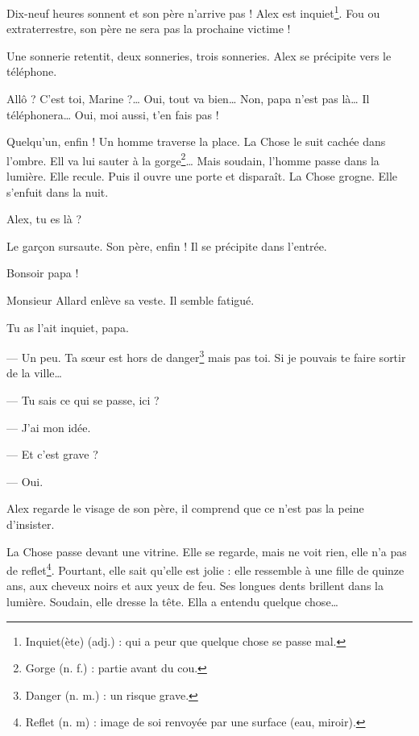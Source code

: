 Dix-neuf heures sonnent et son père n'arrive pas ! Alex est inquiet\footnote{Inquiet(ète) (adj.) : qui a peur que quelque chose se
passe mal.}. Fou ou extraterrestre, son père ne sera pas la prochaine victime !

Une sonnerie retentit, deux sonneries, trois sonneries. Alex se précipite vers le téléphone.

\og Allô ? C'est toi, Marine ?\ldots{} Oui, tout va bien\ldots{} Non, papa n'est pas là\ldots{} Il téléphonera\ldots{} Oui, moi
aussi, t'en fais pas ! \fg{}

Quelqu'un, enfin ! Un homme traverse la place. La Chose le suit cachée dans l'ombre. Ell va lui sauter à la gorge\footnote{Gorge
(n. f.) : partie avant du cou.}\ldots{} Mais soudain, l'homme passe dans la lumière. Elle recule. Puis il ouvre une porte et
disparaît. La Chose grogne. Elle s'enfuit dans la nuit.

\og Alex, tu es là ? \fg{}

Le gar\c{c}on sursaute. Son père, enfin ! Il se précipite dans l'entrée.

\og Bonsoir papa ! \fg{}

Monsieur Allard enlève sa veste. Il semble fatigué.

\og Tu as l'ait inquiet, papa.

--- Un peu. Ta s\oe{}ur est hors de danger\footnote{Danger (n. m.) : un risque grave.} mais pas toi. Si je pouvais te faire sortir
    de la ville\ldots{}

--- Tu sais ce qui se passe, ici ?

--- J'ai mon idée.

--- Et c'est grave ?

--- Oui. \fg{}

Alex regarde le visage de son père, il comprend que ce n'est pas la peine d'insister.

La Chose passe devant une vitrine. Elle se regarde, mais ne voit rien, elle n'a pas de reflet\footnote{Reflet (n. m) : image de
soi renvoyée par une surface (eau, miroir).}. Pourtant, elle sait qu'elle est jolie : elle ressemble à une fille de quinze ans,
aux cheveux noirs et aux yeux de feu. Ses longues dents brillent dans la lumière. Soudain, elle dresse la tête. Ella a entendu
quelque chose\ldots{}
